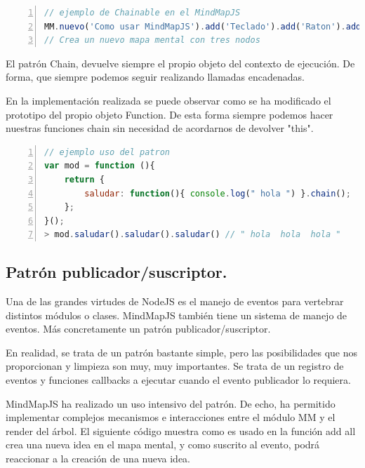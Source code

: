 \begin{lstlisting}[language=JavaScript, numbers=left]
// ejemplo de Chainable en el MindMapJS
MM.nuevo('Como usar MindMapJS').add('Teclado').add('Raton').add('Tablet');
// Crea un nuevo mapa mental con tres nodos 
\end{lstlisting}

El patrón Chain, devuelve siempre el propio objeto del contexto de ejecución. De forma, que siempre podemos seguir realizando llamadas encadenadas. 



En la implementación realizada se puede observar como se ha modificado el prototipo del propio objeto Function. De esta forma siempre podemos hacer nuestras funciones chain sin necesidad de acordarnos de devolver "this".

\begin{lstlisting}[language=JavaScript, numbers=left]
// ejemplo uso del patron
var mod = function (){
	return {
		saludar: function(){ console.log(" hola ") }.chain();
	};
}();
> mod.saludar().saludar().saludar() // " hola  hola  hola "
\end{lstlisting}


\subsection{Patrón publicador/suscriptor.}

Una de las grandes virtudes de NodeJS es el manejo de eventos para vertebrar distintos módulos o clases. MindMapJS también tiene un sistema de manejo de eventos. Más concretamente un patrón publicador/suscriptor. 



En realidad, se trata de un patrón bastante simple, pero las posibilidades que nos proporcionan y limpieza son muy, muy importantes. Se trata de un registro de eventos y funciones callbacks a ejecutar cuando el evento publicador lo requiera. 

MindMapJS ha realizado un uso intensivo del patrón. De echo, ha permitido implementar complejos mecanismos e interacciones entre el módulo MM y el render del árbol. El siguiente código muestra como es usado en la función add all crea una nueva idea en el mapa mental, y como suscrito al evento, podrá reaccionar a la creación de una nueva idea.


